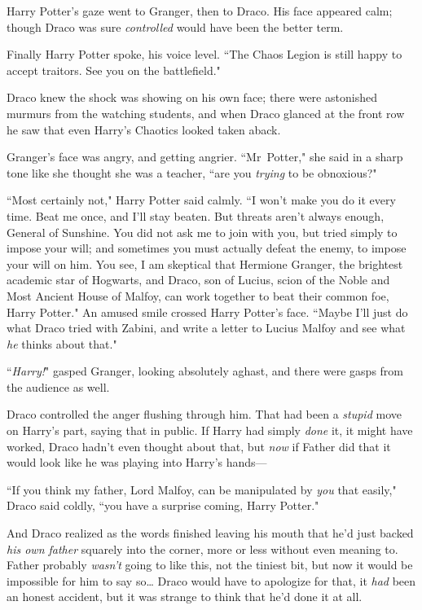 Harry Potter's gaze went to Granger, then to Draco. His face appeared calm; though Draco was sure \emph{controlled} would have been the better term.

Finally Harry Potter spoke, his voice level. ``The Chaos Legion is still happy to accept traitors. See you on the battlefield."

Draco knew the shock was showing on his own face; there were astonished murmurs from the watching students, and when Draco glanced at the front row he saw that even Harry's Chaotics looked taken aback.

Granger's face was angry, and getting angrier. ``Mr~Potter," she said in a sharp tone like she thought she was a teacher, ``are you \emph{trying} to be obnoxious?"

``Most certainly not," Harry Potter said calmly. ``I won't make you do it every time. Beat me once, and I'll stay beaten. But threats aren't always enough, General of Sunshine. You did not ask me to join with you, but tried simply to impose your will; and sometimes you must actually defeat the enemy, to impose your will on him. You see, I am skeptical that Hermione Granger, the brightest academic star of Hogwarts, and Draco, son of Lucius, scion of the Noble and Most Ancient House of Malfoy, can work together to beat their common foe, Harry Potter." An amused smile crossed Harry Potter's face. ``Maybe I'll just do what Draco tried with Zabini, and write a letter to Lucius Malfoy and see what \emph{he} thinks about that."

``\emph{Harry!}" gasped Granger, looking absolutely aghast, and there were gasps from the audience as well.

Draco controlled the anger flushing through him. That had been a \emph{stupid} move on Harry's part, saying that in public. If Harry had simply \emph{done} it, it might have worked, Draco hadn't even thought about that, but \emph{now} if Father did that it would look like he was playing into Harry's hands—

``If you think my father, Lord Malfoy, can be manipulated by \emph{you} that easily," Draco said coldly, ``you have a surprise coming, Harry Potter."

And Draco realized as the words finished leaving his mouth that he'd just backed \emph{his own father} squarely into the corner, more or less without even meaning to. Father probably \emph{wasn't} going to like this, not the tiniest bit, but now it would be impossible for him to say so{\ldots} Draco would have to apologize for that, it \emph{had} been an honest accident, but it was strange to think that he'd done it at all.


